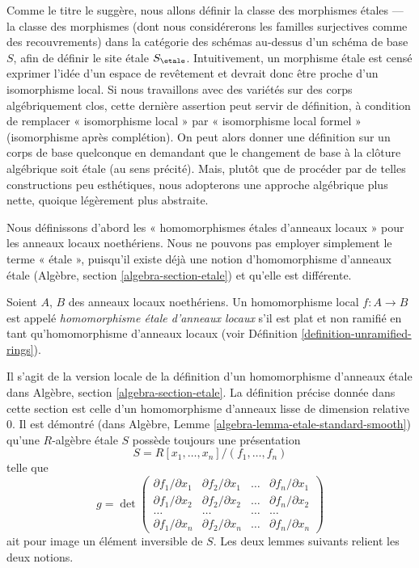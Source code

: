 \medskip\noindent
Comme le titre le suggère, nous allons définir la classe des morphismes \'etales --- la
classe des morphismes (dont nous considérerons les familles surjectives comme des recouvrements)
dans la catégorie des schémas au-dessus d'un schéma de base $S$, afin de définir le
site \'etale $S_\etale$. Intuitivement, un morphisme \'etale est censé
exprimer l'idée d'un espace de revêtement et devrait donc être proche d'un
isomorphisme local. Si nous travaillons avec des variétés sur des corps algébriquement clos,
cette dernière assertion peut servir de définition, à condition de remplacer
« isomorphisme local » par « isomorphisme local formel » (isomorphisme après
complétion). On peut alors donner une définition sur un corps de base quelconque en demandant
que le changement de base à la clôture algébrique soit \'etale (au
sens précité). Mais, plutôt que de procéder par de telles constructions peu
esthétiques, nous adopterons une approche algébrique plus nette, quoique légèrement plus
abstraite.

\medskip\noindent
Nous définissons d'abord les « homomorphismes \'etales d'anneaux locaux » pour les anneaux
locaux noethériens. Nous ne pouvons pas employer simplement le terme « \'etale », puisqu'il
existe déjà une notion d'homomorphisme d'anneaux \'etale
(Algèbre, section \ref{algebra-section-etale})
et qu'elle est différente.

\begin{definition}
\label{definition-etale-ring}
Soient $A$, $B$ des anneaux locaux noethériens.
Un homomorphisme local $f : A \to B$ est appelé
{\it homomorphisme \'etale d'anneaux locaux}
s'il est plat et non ramifié en tant qu'homomorphisme d'anneaux locaux
(voir Définition \ref{definition-unramified-rings}).
\end{definition}

\noindent
Il s'agit de la version locale de la définition d'un homomorphisme d'anneaux \'etale dans
Algèbre, section \ref{algebra-section-etale}.
La définition précise
donnée dans cette section est celle d'un homomorphisme d'anneaux lisse de dimension
relative $0$. Il est démontré (dans
Algèbre, Lemme \ref{algebra-lemma-etale-standard-smooth})
qu'une $R$-algèbre \'etale $S$ possède toujours une présentation
$$
S = R[x_1, \ldots, x_n]/(f_1, \ldots, f_n)
$$
telle que
$$
g =
\det
\left(
\begin{matrix}
\partial f_1/\partial x_1 &
\partial f_2/\partial x_1 &
\ldots &
\partial f_n/\partial x_1 \\
\partial f_1/\partial x_2 &
\partial f_2/\partial x_2 &
\ldots &
\partial f_n/\partial x_2 \\
\ldots & \ldots & \ldots & \ldots \\
\partial f_1/\partial x_n &
\partial f_2/\partial x_n &
\ldots &
\partial f_n/\partial x_n
\end{matrix}
\right)
$$
ait pour image un élément inversible de $S$. Les deux lemmes suivants relient les deux
notions.

